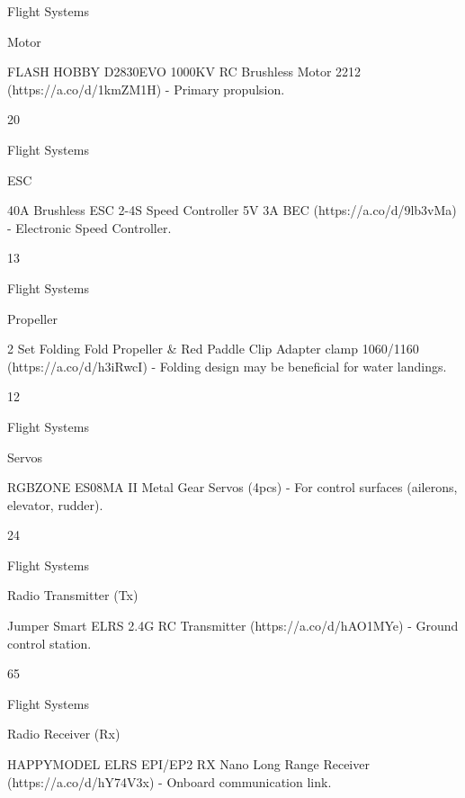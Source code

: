 \documentclass[11pt,letterpaper]{article}
\begin{document}
Flight Systems\par

Motor\par

FLASH HOBBY D2830EVO 1000KV RC Brushless Motor 2212 (https://a.co/d/1kmZM1H) - Primary propulsion.\par

20\par

Flight Systems\par

ESC\par

40A Brushless ESC 2-4S Speed Controller 5V 3A BEC (https://a.co/d/9lb3vMa) - Electronic Speed Controller.\par

13\par

Flight Systems\par

Propeller\par

2 Set Folding Fold Propeller \& Red Paddle Clip Adapter clamp 1060/1160 (https://a.co/d/h3iRwcI) - Folding design may be beneficial for water landings.\par

12\par

Flight Systems\par

Servos\par

RGBZONE ES08MA II Metal Gear Servos (4pcs) - For control surfaces (ailerons, elevator, rudder).\par

24\par

Flight Systems\par

Radio Transmitter (Tx)\par

Jumper Smart ELRS 2.4G RC Transmitter (https://a.co/d/hAO1MYe) - Ground control station.\par

65\par

Flight Systems\par

Radio Receiver (Rx)\par

HAPPYMODEL ELRS EPI/EP2 RX Nano Long Range Receiver (https://a.co/d/hY74V3x) - Onboard communication link.\par
\end{document}
